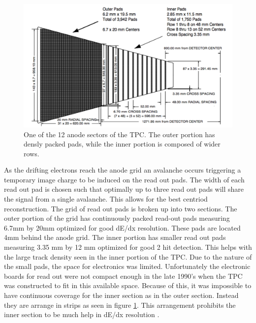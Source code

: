 \documentclass[abstract = on,listof=totoc, bibliography=totoc]{scrreprt}
\begin{document}
\begin{figure}
\begin{center}
\includegraphics[width = 1\textwidth]{tpcPAD}
\caption[Anode sector of STAR TPC]{One of the 12 anode sectors of the TPC. The outer portion has densly packed pads, while the inner portion is composed of wider rows.}
\label{fig:tpcPad}
\end{center}
\end{figure}
As the drifting electrons reach the anode grid an avalanche occurs triggering a temporary image charge to be induced on the read out pads. The width of each read out pad is chosen such that optimally up to three read out pads will share the signal from a single avalanche. This allows for the best centriod reconstruction. The grid of read out pads is broken up into two sections. The outer portion of the grid has continuously packed read-out pads measuring 6.7mm by 20mm optimized for good dE/dx resolution. These pads are located 4mm behind the anode grid. The inner portion has smaller read out pads measuring 3.35 mm by 12 mm optimized for good 2 hit detection. This helps with the large track density seen in the inner portion of the TPC. Due to the nature of the small pads, the space for electronics was limited. Unfortunately the electronic boards for read out were not compact enough in the late 1990's when the TPC was constructed to fit in this available space. Because of this, it was impossible to have continuous coverage for the inner section as in the outer section. Instead they are arrange in strips as seen in figure \ref{fig:tpcPad}. This arrangement prohibits the inner section to be much help in dE/dx resolution \cite{TPC}.
\end{document}
